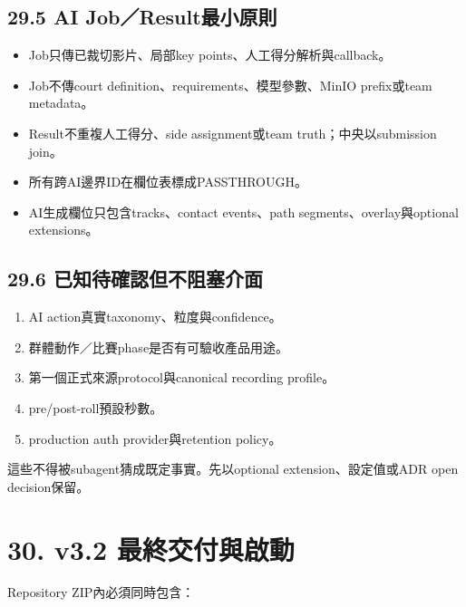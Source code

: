 \documentclass[
  9pt,
  a4paper,
]{article}
\providecommand{\tightlist}{%
  \setlength{\itemsep}{0pt}\setlength{\parskip}{0pt}}
\begin{document}
\subsection{29.5 AI
Job／Result最小原則}\label{295-ai-jobresultux6700ux5c0fux539fux5247}

\begin{itemize}
\tightlist
\item
  Job只傳已裁切影片、局部key points、人工得分解析與callback。
\item
  Job不傳court definition、requirements、模型參數、MinIO prefix或team
  metadata。
\item
  Result不重複人工得分、side assignment或team truth；中央以submission
  join。
\item
  所有跨AI邊界ID在欄位表標成PASSTHROUGH。
\item
  AI生成欄位只包含tracks、contact events、path
  segments、overlay與optional extensions。
\end{itemize}

\subsection{29.6
已知待確認但不阻塞介面}\label{296-ux5df2ux77e5ux5f85ux78baux8a8dux4f46ux4e0dux963bux585eux4ecbux9762}

\begin{enumerate}
\def\labelenumi{\arabic{enumi}.}
\tightlist
\item
  AI action真實taxonomy、粒度與confidence。
\item
  群體動作／比賽phase是否有可驗收產品用途。
\item
  第一個正式來源protocol與canonical recording profile。
\item
  pre/post-roll預設秒數。
\item
  production auth provider與retention policy。
\end{enumerate}

這些不得被subagent猜成既定事實。先以optional extension、設定值或ADR open
decision保留。

\section{30. v3.2
最終交付與啟動}\label{30-v32-ux6700ux7d42ux4ea4ux4ed8ux8207ux555fux52d5}

Repository ZIP內必須同時包含：
\end{document}
